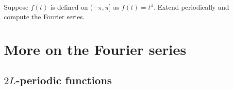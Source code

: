 \begin{exercise}
Suppose $f(t)$ is defined on $(-\pi,\pi]$ as $f(t) = t^4$.
Extend periodically and compute the Fourier series.
\end{exercise}


\sectionnewpage
\section{More on the Fourier series}
\label{moreonfourier:section}




\subsection{$2L$-periodic functions}

